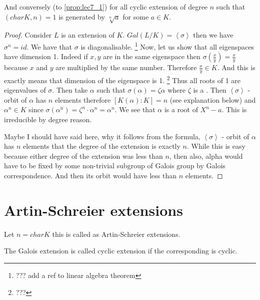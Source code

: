 \begin{proposition}
  And conversely (to \ref{prop:lec7_1}) for all cyclic extension of
  degree $n$ such that $\left(char K, n\right) = 1$ is generated by
  $\sqrt[n]{a}$ for some $a \in K$.
  \begin{proof}
    Consider $L$ is an extension of $K$.
    $Gal\left(L/K\right) = \left<\sigma\right>$ then we have
    $\sigma^n = id$. We have that $\sigma$ is diagonalisable.
    \footnote{
      ??? add a ref to linear algebra theorem
    }
    Now, let us show that all eigenspaces have dimension 1. Indeed if
    $x,y$ are in the same eigenspace then
    $\sigma\left(\frac{x}{y}\right) = \frac{x}{y}$ because $x$ and $y$
    are multiplied by the same number. Therefore $\frac{x}{y} \in
    K$. And this is exactly means that dimension of the eigenspace is
    1.
    \footnote{
      ???
    }
    Thus all roots of 1 are eigenvalues of $\sigma$. Then take
    $\alpha$ such that $\sigma\left(\alpha\right) = \zeta \alpha$
    where $\zeta$ is a . Then
    $\left<\sigma\right>$ - orbit of $\alpha$ has $n$ elements
    therefore $\left[K\left(\alpha\right):K\right] = n$ (see
    explanation below) and $\alpha^n
    \in K$ since $\sigma\left(\alpha^n\right) = \zeta^n \cdot \alpha^n
    = \alpha^n$. We see that $\alpha$ is a root of $X^n - a$. This is
    irreducible by degree reason.

    Maybe I should have said here, why it follows from the formula,
    $\left<\sigma\right>$ - orbit of $\alpha$ has $n$ elements
    that the degree of the extension is exactly $n$. While this is
    easy because either degree of the extension was less than $n$,
    then also, alpha would have to be fixed by some non-trivial
    subgroup of Galois group by Galois correspondence. And then its
    orbit would have less than $n$ elements.  
  \end{proof}
  \label{prop:lec7_2}
\end{proposition}
  
\section{Artin-Schreier extensions}
Let $n = char K$ this is called as Artin-Schreier extensions.

\begin{definition}
  The Galois extension is called cyclic extension if the corresponding
   is cyclic.
  \label{def:cyclicextension}
\end{definition}


